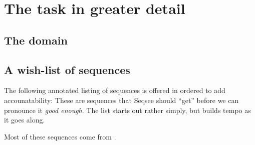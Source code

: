 \documentclass{article}
\begin{document}
\section{The task in greater detail}
\label{sec:task}


\subsection{The domain}
\label{sec:domain}


\subsection{A wish-list of sequences}
\label{sec:list}

The following annotated listing of sequences is offered in ordered to add accounatability: These are sequences that Seqsee should ``get'' before we can pronounce it \emph{good enough}. The list starts out rather simply, but builds tempo as it goes along.

Most of these sequences come from \cite[Chapter 1]{Hofstadter:FCCA}.
\end{document}
